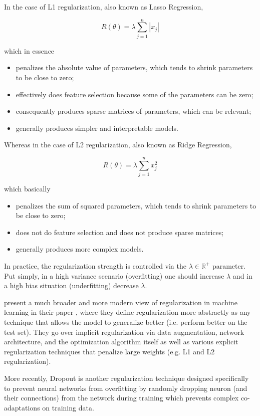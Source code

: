 In the case of L1 regularization, also known as Lasso Regression,

$$
R(\theta) = \lambda \sum_{j=1}^{n} |x_j|
$$

which in essence

\begin{itemize}
    \item penalizes the absolute value of parameters, which tends to shrink parameters to be close to zero;
    \item effectively does feature selection because some of the parameters can be zero;
    \item consequently produces sparse matrices of parameters, which can be relevant;
    \item generally produces simpler and interpretable models.
\end{itemize}

Whereas in the case of L2 regularization, also known as Ridge Regression,

$$
R(\theta) = \lambda \sum_{j=1}^{n} x_j^2
$$

which basically

\begin{itemize}
    \item penalizes the sum of squared parameters, which tends to shrink parameters to be close to zero;
    \item does not do feature selection and does not produce sparse matrices;
    \item generally produces more complex models.
\end{itemize}

In practice, the regularization strength is controlled via the $\lambda \in \mathbb{{R}^{+}}$ parameter. Put simply, in a high variance scenario (overfitting) one should increase $\lambda$ and in a high bias situation (underfitting) decrease $\lambda$.

\citeauthor{regularizationsurvey} present a much broader and more modern view of regularization in machine learning in their \citeyear{regularizationsurvey} paper \cite{regularizationsurvey}, where they define regularization more abstractly as any technique that allows the model to generalize better (i.e. perform better on the test set). They go over implicit regularization via data augmentation, network architecture, and the optimization algorithm itself as well as various explicit regularization techniques that penalize large weights (e.g. L1 and L2 regularization).

More recently, Dropout \cite{dropout} is another regularization technique designed specifically to prevent neural networks from overfitting by randomly dropping neuron (and their connections) from the network during training which prevents complex co-adaptations on training data.

